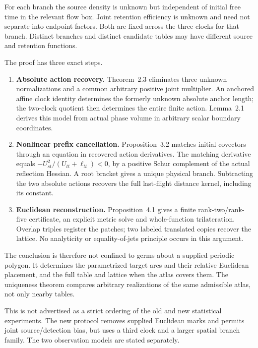 \documentclass[
  11pt,
]{article}
\providecommand{\tightlist}{%
  \setlength{\itemsep}{0pt}\setlength{\parskip}{0pt}}
\begin{document}
For each branch the source density is unknown but independent of initial
free time in the relevant flow box. Joint retention efficiency is
unknown and need not separate into endpoint factors. Both are fixed
across the three clocks for that branch. Distinct branches and distinct
candidate tables may have different source and retention functions.

The proof has three exact steps.

\begin{enumerate}
\def\labelenumi{\arabic{enumi}.}
\tightlist
\item
  \textbf{Absolute action recovery.} Theorem~2.3 eliminates
  three unknown normalizations and a common arbitrary positive joint
  multiplier. An anchored affine clock identity determines the formerly
  unknown absolute anchor length; the two-clock quotient then determines
  the entire finite action. Lemma~2.1 derives this model
  from actual phase volume in arbitrary scalar boundary coordinates.
\item
  \textbf{Nonlinear prefix cancellation.} Proposition~3.2
  matches initial covectors through an equation in recovered action
  derivatives. The matching derivative equals
  \(-U_{st}^2/(U_{tt}+\ell_{tt})<0\), by a positive Schur
  complement of the actual reflection Hessian. A root bracket gives a
  unique physical branch. Subtracting the two absolute actions recovers
  the full last-flight distance kernel, including its constant.
\item
  \textbf{Euclidean reconstruction.} Proposition~4.1 gives a
  finite rank-two/rank-five certificate, an explicit metric solve and
  whole-function trilateration. Overlap triples register the patches;
  two labeled translated copies recover the lattice. No analyticity or
  equality-of-jets principle occurs in this argument.
\end{enumerate}

The conclusion is therefore not confined to germs about a supplied
periodic polygon. It determines the parametrized target arcs and their
relative Euclidean placement, and the full table and lattice when the
atlas covers them. The uniqueness theorem compares arbitrary
realizations of the same admissible atlas, not only nearby tables.

This is not advertised as a strict ordering of the old and new
statistical experiments. The new protocol removes supplied Euclidean
marks and permits joint source/detection bias, but uses a third clock
and a larger spatial branch family. The two observation models are
stated separately.
\end{document}
